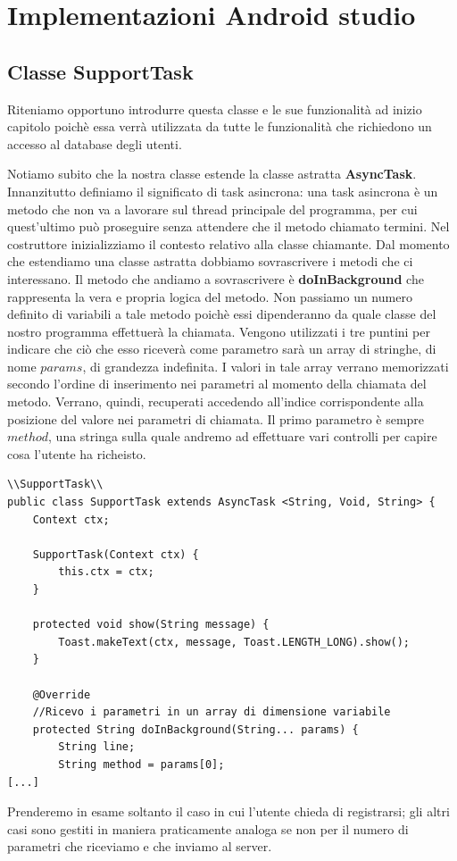 \documentclass[a4paper, 50pt, twoside]{article}
\begin{document}
\section{Implementazioni Android studio}
\subsection{Classe SupportTask}
Riteniamo opportuno introdurre questa classe e le sue funzionalità ad inizio capitolo poichè essa verrà utilizzata da tutte le funzionalità che richiedono un accesso al database degli utenti. 

Notiamo subito che la nostra classe estende la classe astratta \textbf{AsyncTask}. Innanzitutto definiamo il significato di task asincrona: una task asincrona è un metodo che non va a lavorare sul thread principale del programma, per cui quest'ultimo può proseguire senza attendere che il metodo chiamato termini. Nel costruttore inizializziamo il contesto relativo alla classe chiamante. Dal momento che estendiamo una classe astratta dobbiamo sovrascrivere i metodi che ci interessano. Il metodo che andiamo a sovrascrivere è \textbf{doInBackground} che rappresenta la vera e propria logica del metodo. Non passiamo un numero definito di variabili a tale metodo poichè essi dipenderanno da quale classe del nostro programma effettuerà la chiamata. Vengono utilizzati i tre puntini per indicare che ciò che esso riceverà come parametro sarà un array di stringhe, di nome $params$, di grandezza indefinita. I valori in tale array verrano memorizzati secondo l'ordine di inserimento nei parametri al momento della chiamata del metodo. Verrano, quindi, recuperati accedendo all'indice corrispondente alla posizione del valore nei parametri di chiamata. Il primo parametro è sempre $method$, una stringa sulla quale andremo ad effettuare vari controlli per capire cosa l'utente ha richeisto. 
\begin{lstlisting}
\\SupportTask\\
public class SupportTask extends AsyncTask <String, Void, String> {
    Context ctx;

    SupportTask(Context ctx) {
        this.ctx = ctx;
    }

    protected void show(String message) {
        Toast.makeText(ctx, message, Toast.LENGTH_LONG).show();
    }

    @Override
    //Ricevo i parametri in un array di dimensione variabile
    protected String doInBackground(String... params) {
        String line;
        String method = params[0];
[...]
\end{lstlisting}
Prenderemo in esame soltanto il caso in cui l'utente chieda di registrarsi; gli altri casi sono gestiti in maniera praticamente analoga se non per il numero di parametri che riceviamo e che inviamo al server. 
\end{document}
